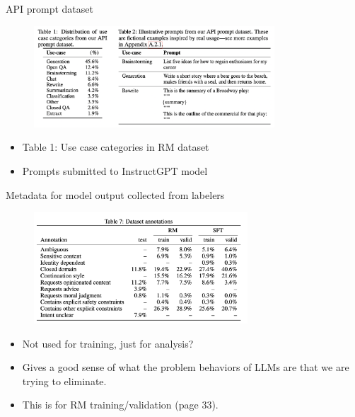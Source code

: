 \begin{vbframe}{API prompt dataset}

\vfill

\begin{figure}
\centering
\includegraphics[width = 9cm]{figure/apipromptdataset.png}
\end{figure}

\begin{itemize}
	\item Table 1: Use case categories in RM dataset
        \item Prompts  submitted to
        InstructGPT model
\end{itemize}



\vfill

\end{vbframe}


\begin{vbframe}{Metadata for model output collected from labelers}

\vfill

\begin{figure}
\centering
\includegraphics[width = 8cm]{figure/instructgpttable3b.png}
\end{figure}

\begin{itemize}
	\item Not used for training, just for analysis?
	\item Gives a good sense of what the problem
	behaviors of LLMs are
	that we are trying to eliminate.
        \item This is for RM training/validation (page 33).
\end{itemize}

\vfill

\end{vbframe}

